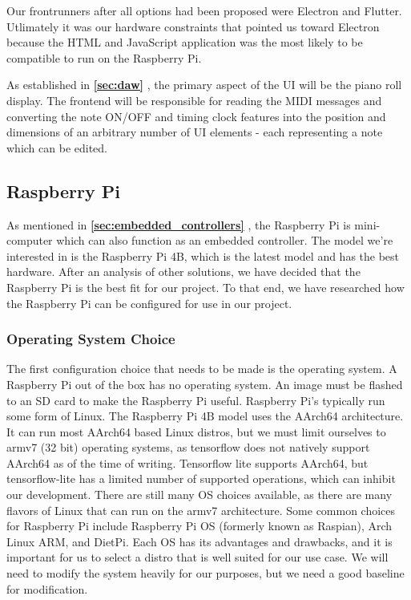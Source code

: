 Our frontrunners after all options had been proposed were Electron and Flutter. Utlimately it was
our hardware constraints that pointed us toward Electron because the HTML and JavaScript
application was the most likely to be compatible to run on the Raspberry Pi.

As established in \textbf{\ref{sec:daw} }, the primary aspect of the UI
will be the piano roll display. The frontend will be responsible for reading the MIDI
messages and converting the note ON/OFF and timing clock features into the position and
dimensions of an arbitrary number of UI elements - each representing a note which can be
edited.

\subsection{Raspberry Pi}

As mentioned in \textbf{\ref{sec:embedded_controllers} },
the Raspberry Pi is mini-computer which can also function as an embedded controller. The
model we're interested in is the Raspberry Pi 4B, which is the latest model and has the
best hardware. After an analysis of other solutions, we have decided that the
Raspberry Pi is the best fit for our project. To that end, we have researched how the
Raspberry Pi can be configured for use in our project.

\subsubsection{Operating System Choice}

The first configuration choice that needs to be made is the operating system. A Raspberry
Pi out of the box has no operating system. An image must be flashed to an SD card to make
the Raspberry Pi useful. Raspberry Pi's typically run some form of Linux. The Raspberry Pi
4B model uses the AArch64 architecture. It can run most AArch64 based Linux distros, but
we must limit ourselves to armv7 (32 bit) operating systems, as tensorflow does not
natively support AArch64 as of the time of writing. Tensorflow lite supports AArch64, but
tensorflow-lite has a limited number of supported operations, which can inhibit our
development. There are still many OS choices available, as there are many flavors of Linux
that can run on the armv7 architecture. Some common choices for Raspberry Pi include
Raspberry Pi OS (formerly known as Raspian), Arch Linux ARM, and DietPi. Each OS has its
advantages and drawbacks, and it is important for us to select a distro that is well
suited for our use case. We will need to modify the system heavily for our purposes, but
we need a good baseline for modification.

